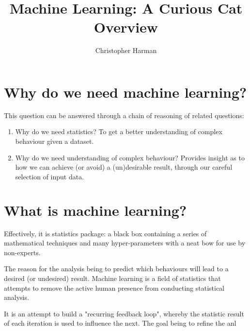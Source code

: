 \documentclass[11pt]{article}
\begin{document}
\thispagestyle{empty}

\title{Machine Learning: A Curious Cat Overview}
\author{Christopher Harman}
\maketitle
\tableofcontents

\newpage


\section{Why do we need machine learning?}
This question can be answered through a chain of reasoning of related questions:
\begin{enumerate}
\item Why do we need statistics? To get a better understanding of complex behaviour given a dataset.
\item Why do we need understanding of complex behaviour? Provides insight as to how we can achieve (or avoid) a (un)desirable result, through our careful selection of input data.
\end{enumerate}



\section{What is machine learning?}
Effectively, it is statistics package: a black box containing a series of mathematical techniques and many hyper-parameters with a neat bow for use by non-experts.

The reason for the analysis being to predict which behaviours will lead to a desired (or undesired) result.
Machine learning is a field of statistics that attempts to remove the active human presence from conducting statistical analysis.

It is an attempt to build a "recurring feedback loop", whereby the statistic result of each iteration is used to influence the next. The goal being to refine the anl
\end{document}
